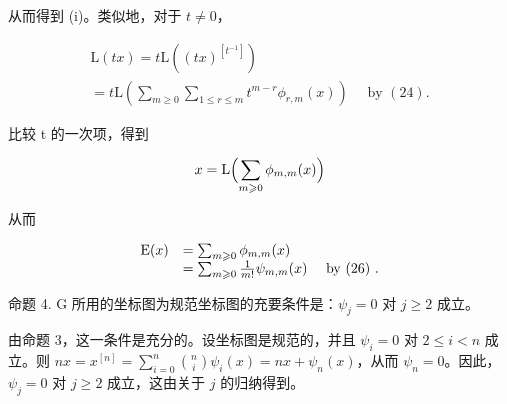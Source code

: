 从而得到 (i)。类似地，对于 \(t \neq 0\)，

\[
\begin{array}{l} \mathrm{L} (t x) = t \mathrm{L} ((t x) ^ {[ t ^ {- 1} ]}) \\ = t \mathrm{L} \left(\sum_ {m \geqslant 0} \sum_ {1 \leqslant r \leqslant m} t ^ {m - r} \phi_ {r, m} (x)\right) \quad \text { by } (24). \end{array}
\]

比较 t 的一次项，得到

\[
x = \mathrm{L} \Bigl (\sum_ {m \geqslant 0} \phi_ {m, m} (x) \Bigr)
\]

从而

\[
\begin{array}{r l} \mathrm{E} (x) & = \sum_ {m \geqslant 0} \phi_ {m, m} (x) \\ & = \sum_ {m \geqslant 0} \frac {1}{m !} \psi_ {m, m} (x) \quad \text { by   (26) }. \end{array}
\]

命题 4. G 所用的坐标图为规范坐标图的充要条件是：\(\psi_j = 0\) 对 \(j \geqslant 2\) 成立。

由命题 3，这一条件是充分的。设坐标图是规范的，并且 \(\psi_{i} = 0\) 对 \(2 \leqslant i < n\) 成立。则 \(nx = x^{[n]} = \sum_{i=0}^{n} \binom{n}{i} \psi_{i}(x) = nx + \psi_{n}(x)\)，从而 \(\psi_{n} = 0\)。因此，\(\psi_{j} = 0\) 对 \(j \geqslant 2\) 成立，这由关于 \(j\) 的归纳得到。

